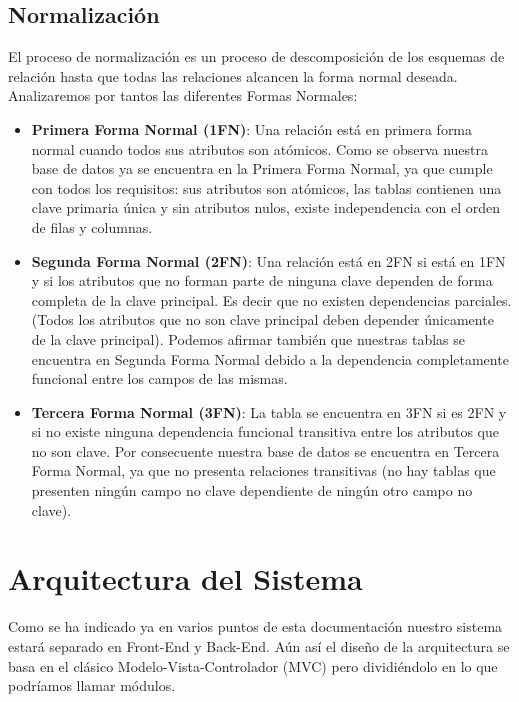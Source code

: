 \subsection{Normalización}

El proceso de normalización es un proceso de descomposición de los esquemas de relación hasta que
todas las relaciones alcancen la forma normal deseada.\cite{normalizacion} Analizaremos por tantos las diferentes Formas Normales:

\vspace{-0.5em}
\begin{itemize}
    \item \textbf{Primera Forma Normal (1FN)}: Una relación está en primera forma normal cuando todos sus atributos son atómicos.\cite{1fn} Como se observa nuestra base de datos ya se encuentra en la Primera Forma Normal, ya que cumple con todos los requisitos: sus atributos son atómicos, las tablas contienen una clave primaria única y sin atributos nulos, existe independencia con el orden de filas y columnas.

    \item \textbf{Segunda Forma Normal (2FN)}: Una relación está en 2FN si está en 1FN y si los atributos que no forman parte de ninguna clave dependen de forma completa de la clave principal. Es decir que no existen dependencias parciales. (Todos los atributos que no son clave principal deben depender únicamente de la clave principal).\cite{2fn} Podemos afirmar también que nuestras tablas se encuentra en Segunda Forma Normal debido a la dependencia completamente funcional entre los campos de las mismas.

    \item \textbf{Tercera Forma Normal (3FN)}: La tabla se encuentra en 3FN si es 2FN y si no existe ninguna dependencia funcional transitiva entre los atributos que no son clave.\cite{3fn} Por consecuente nuestra base de datos se encuentra en Tercera Forma Normal, ya que no presenta relaciones transitivas (no hay tablas que presenten ningún campo no clave dependiente de ningún otro campo no clave).
\end{itemize}

\section{Arquitectura del Sistema}

Como se ha indicado ya en varios puntos de esta documentación nuestro sistema estará separado en Front-End y Back-End. Aún así el diseño de la arquitectura se basa en el clásico Modelo-Vista-Controlador (MVC) pero dividiéndolo en lo que podríamos llamar módulos.

